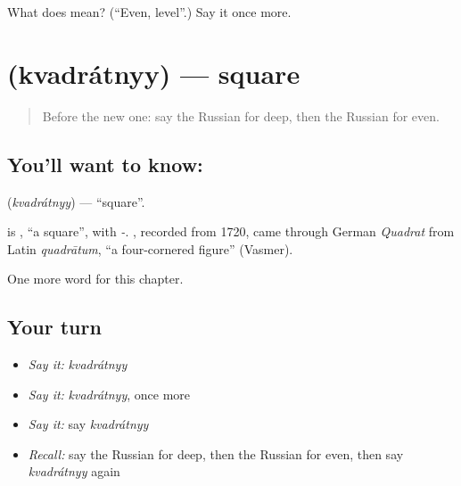 \begin{tcolorbox}[breakable,colback=teal!4,colframe=teal!35!black,title={Before you move on}]
What does  mean? (\textquotedblleft{}Even, level\textquotedblright{}.) Say it once more.
\end{tcolorbox}
\section[\texorpdfstring{\ru{квадратный} (kvadrátnyy)}{квадратный (kvadrátnyy)}]{ (kvadrátnyy) — square}

\label{lesson:RU-C187-kvadratnyy}



\begin{quote}
Before the new one: say the Russian for deep, then the Russian for even.
\end{quote}

\subsection*{You'll want to know: }
\textbf{} (\emph{kvadrátnyy}) — \textquotedblleft{}square\textquotedblright{}.

\begin{cousinweb}
\textbf{} is \emph{}, \textquotedblleft{}a square\textquotedblright{}, with \emph{-}. \emph{}, recorded from 1720, came through German \emph{Quadrat} from Latin \emph{quadrātum}, \textquotedblleft{}a four-cornered figure\textquotedblright{} (Vasmer).
\end{cousinweb}

\begin{grammarlens}[title={What you've built}]
One more word for this chapter.
\end{grammarlens}

\subsection*{Your turn}
\begin{itemize}
\raggedright
  \item \emph{Say it:} \emph{kvadrátnyy}
  \item \emph{Say it:} \emph{kvadrátnyy}, once more
  \item \emph{Say it:} say \emph{kvadrátnyy}
  \item \emph{Recall:} say the Russian for deep, then the Russian for even, then say \emph{kvadrátnyy} again
\end{itemize}


